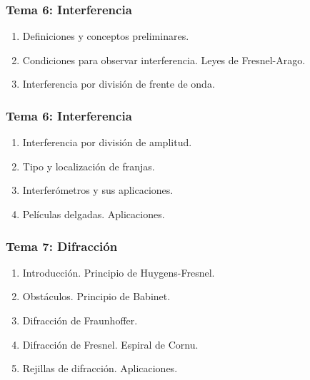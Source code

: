 \documentclass[12pt]{beamer}
\begin{document}
\begin{frame}
\frametitle{\textbf{Tema 6: Interferencia}}
\begin{enumerate}[<+->]
\item Definiciones y conceptos preliminares.
\item Condiciones para observar interferencia. Leyes de Fresnel-Arago.
\item Interferencia por división de frente de onda.
\seti
\end{enumerate}
\end{frame}
\begin{frame}
\frametitle{\textbf{Tema 6: Interferencia}}
\begin{enumerate}[<+->]
\conti
\item Interferencia por división de amplitud.
\item Tipo y localización de franjas.
\item Interferómetros y sus aplicaciones.
\item Películas delgadas. Aplicaciones.
\end{enumerate}
\end{frame}
\begin{frame}
\frametitle{\textbf{Tema 7: Difracción}}
\begin{enumerate}[<+->]
\item Introducción. Principio de Huygens-Fresnel.
\item Obstáculos. Principio de Babinet.
\item Difracción de Fraunhoffer.
\item Difracción de Fresnel. Espiral de Cornu.
\item Rejillas de difracción. Aplicaciones.
\end{enumerate}
\end{frame}
\end{document}
